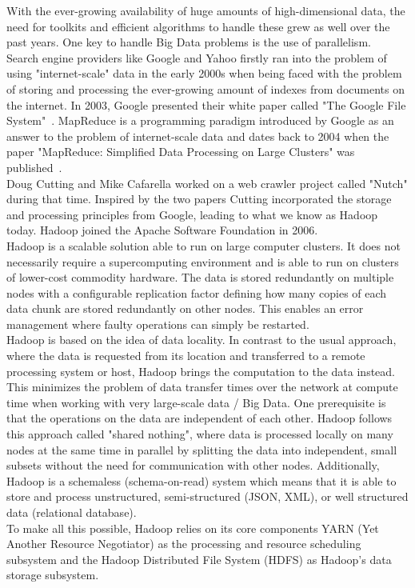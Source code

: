 With the ever-growing availability of huge amounts of high-dimensional data, the need for toolkits and efficient algorithms to handle these grew as well over the past years. One key to handle Big Data problems is the use of parallelism.\\
Search engine providers like Google and Yahoo firstly ran into the problem of using "internet-scale" data in the early 2000s when being faced with the problem of storing and processing the ever-growing amount of indexes from documents on the internet. In 2003, Google presented their white paper called "The Google File System"~\cite{gfs}. MapReduce is a programming paradigm introduced by Google as an answer to the problem of internet-scale data and dates back to 2004 when the paper "MapReduce: Simplified Data Processing on Large Clusters" was published~\cite{mapreduce1}.\\ 
Doug Cutting and Mike Cafarella worked on a web crawler project called "Nutch" during that time. Inspired by the two papers Cutting incorporated the storage and processing principles from Google, leading to what we know as Hadoop today. Hadoop joined the Apache Software Foundation in 2006.~\cite[p. 6]{sparkbook1}\\ 
Hadoop is a scalable solution able to run on large computer clusters. It does not necessarily require a supercomputing environment and is able to run on clusters of lower-cost commodity hardware. The data is stored redundantly on multiple nodes with a configurable replication factor defining how many copies of each data chunk are stored redundantly on other nodes. This enables an error management where faulty operations can simply be restarted.\\
Hadoop is based on the idea of data locality. In contrast to the usual approach, where the data is requested from its location and transferred to a remote processing system or host, Hadoop brings the computation to the data instead. This minimizes the problem of data transfer times over the network at compute time when working with very large-scale data / Big Data. One prerequisite is that the operations on the data are independent of each other. Hadoop follows this approach called "shared nothing", where data is processed locally on many nodes at the same time in parallel by splitting the data into independent, small subsets without the need for communication with other nodes. Additionally, Hadoop is a schemaless (schema-on-read) system which means that it is able to store and process unstructured, semi-structured (JSON, XML), or well structured data (relational database).~\cite[p. 7]{sparkbook1}\\
To make all this possible, Hadoop relies on its core components YARN (Yet Another Resource Negotiator) as the processing and resource scheduling subsystem and the Hadoop Distributed File System (HDFS) as Hadoop's data storage subsystem.\\

